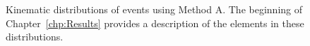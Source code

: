 \begin{figure}[h!]
\caption{Kinematic distributions of \photwojet events using Method A. The beginning of Chapter~\ref{chp:Results} provides a description of the elements in these distributions.}
\label{fig:pjSetThree}
\end{figure}
\clearpage

